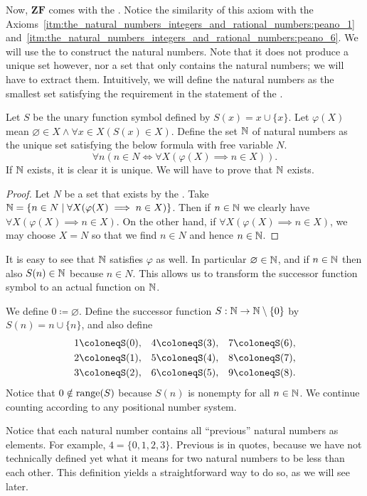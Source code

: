 \documentclass[../main.tex]{subfiles}
\begin{document}
Now, $\mathbf{ZF}$ comes with the . Notice the similarity of this axiom with the Axioms~\ref{itm:the_natural_numbers_integers_and_rational_numbers:peano_1}~and~\ref{itm:the_natural_numbers_integers_and_rational_numbers:peano_6}. We will use the  to construct the natural numbers. Note that it does not produce a unique set however, nor a set that only contains the natural numbers; we will have to extract them. Intuitively, we will define the natural numbers as the smallest set satisfying the requirement in the statement of the .
\begin{definition}\label{dfn:the_natural_numbers_integers_and_rational_numbers:natural_numbers}
    Let $S$ be the unary function symbol defined by $S(x)=x\cup\{x\}$. Let $\varphi(X)$ mean $\varnothing\in X\land\forall x\in X(S(x)\in X)$. Define the set $\mathbb{N}$ of natural numbers as the unique set satisfying the below formula with free variable $N$.
    \begin{equation*}
        \forall n(n\in N\iff\forall X(\varphi(X)\implies n\in X)).
    \end{equation*}
    If $\mathbb{N}$ exists, it is clear it is unique. We will have to prove that $\mathbb{N}$ exists.
\end{definition}
\begin{proof}
    Let $N$ be a set that exists by the . Take $\mathbb{N}=\{n\in N\mid\forall X(\varphi(X)\implies n\in X)\}$. Then if $n\in\mathbb{N}$ we clearly have $\forall X(\varphi(X)\implies n\in X)$. On the other hand, if $\forall X(\varphi(X)\implies n\in X)$, we may choose $X=N$ so that we find $n\in N$ and hence $n\in\mathbb{N}$.
\end{proof}
It is easy to see that $\mathbb{N}$ satisfies $\varphi$ as well. In particular $\varnothing\in\mathbb{N}$, and if $n\in\mathbb{N}$ then also $S(n)\in\mathbb{N}$ because $n\in N$. This allows us to transform the successor function symbol to an actual function on $\mathbb{N}$.
\begin{definition}
    We define $0\coloneq\varnothing$. Define the successor function $S:\mathbb{N}\to\mathbb{N}\setminus\{0\}$ by $S(n)=n\cup\{n\}$, and also define
    \begin{align*}
        1 & \coloneqS(0), & 4 & \coloneqS(3), & 7 & \coloneqS(6), \\
        2 & \coloneqS(1), & 5 & \coloneqS(4), & 8 & \coloneqS(7), \\
        3 & \coloneqS(2), & 6 & \coloneqS(5), & 9 & \coloneqS(8).
    \end{align*}
    Notice that $0\notin\operatorname{range}(S)$ because $S(n)$ is nonempty for all $n\in\mathbb{N}$. We continue counting according to any positional number system.
\end{definition}
Notice that each natural number contains all ``previous'' natural numbers as elements. For example, $4=\{0,1,2,3\}$. Previous is in quotes, because we have not technically defined yet what it means for two natural numbers to be less than each other. This definition yields a straightforward way to do so, as we will see later.
\end{document}
